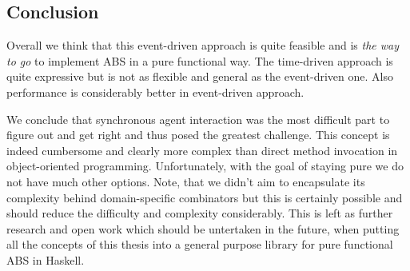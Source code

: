 
\subsection{Conclusion}
Overall we think that this event-driven approach is quite feasible and is \textit{the way to go} to implement ABS in a pure functional way. The time-driven approach is quite expressive but is not as flexible and general as the event-driven one. Also performance is considerably better in event-driven approach.

We conclude that synchronous agent interaction was the most difficult part to figure out and get right and thus posed the greatest challenge. This concept is indeed cumbersome and clearly more complex than direct method invocation in object-oriented programming. Unfortunately, with the goal of staying pure we do not have much other options. Note, that we didn't aim to encapsulate its complexity behind domain-specific combinators but this is certainly possible and should reduce the difficulty and complexity considerably. This is left as further research and open work which should be untertaken in the future, when putting all the concepts of this thesis into a general purpose library for pure functional ABS in Haskell.

